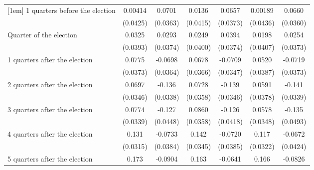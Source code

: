 \begin{table}[htbp]
\begin{tabular}{l*{6}{c}}
[1em]
 1 quarters before the election&     0.00414         &      0.0701         &      0.0136         &      0.0657         &     0.00189         &      0.0660         \\
                    &    (0.0425)         &    (0.0363)         &    (0.0415)         &    (0.0373)         &    (0.0436)         &    (0.0360)         \\
[1em]
Quarter of the election&      0.0325         &      0.0293         &      0.0249         &      0.0394         &      0.0198         &      0.0254         \\
                    &    (0.0393)         &    (0.0374)         &    (0.0400)         &    (0.0374)         &    (0.0407)         &    (0.0373)         \\
[1em]
 1 quarters after the election&      0.0775\sym{*}  &     -0.0698         &      0.0678         &     -0.0709\sym{*}  &      0.0520         &     -0.0719         \\
                    &    (0.0373)         &    (0.0364)         &    (0.0366)         &    (0.0347)         &    (0.0387)         &    (0.0373)         \\
[1em]
 2 quarters after the election&      0.0697\sym{*}  &      -0.136\sym{***}&      0.0728\sym{*}  &      -0.139\sym{***}&      0.0591         &      -0.141\sym{***}\\
                    &    (0.0346)         &    (0.0338)         &    (0.0358)         &    (0.0346)         &    (0.0378)         &    (0.0339)         \\
[1em]
 3 quarters after the election&      0.0774\sym{*}  &      -0.127\sym{**} &      0.0860\sym{*}  &      -0.126\sym{**} &      0.0578         &      -0.135\sym{**} \\
                    &    (0.0339)         &    (0.0448)         &    (0.0358)         &    (0.0418)         &    (0.0348)         &    (0.0493)         \\
[1em]
 4 quarters after the election&       0.131\sym{***}&     -0.0733         &       0.142\sym{***}&     -0.0720         &       0.117\sym{***}&     -0.0672         \\
                    &    (0.0315)         &    (0.0384)         &    (0.0345)         &    (0.0385)         &    (0.0322)         &    (0.0424)         \\
[1em]
 5 quarters after the election&       0.173\sym{***}&     -0.0904\sym{**} &       0.163\sym{***}&     -0.0641         &       0.166\sym{***}&     -0.0826\sym{*}  \\

\end{tabular}
\end{table}
